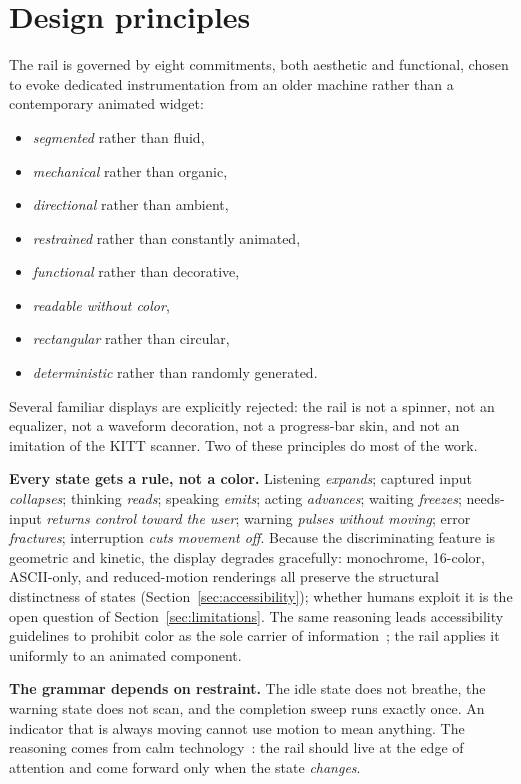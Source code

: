 \documentclass[11pt]{article}
\begin{document}
\section{Design principles}
\label{sec:principles}

The rail is governed by eight commitments, both aesthetic and functional, chosen to
evoke dedicated instrumentation from an older machine rather than a
contemporary animated widget:

\begin{itemize}
\item \emph{segmented} rather than fluid,
\item \emph{mechanical} rather than organic,
\item \emph{directional} rather than ambient,
\item \emph{restrained} rather than constantly animated,
\item \emph{functional} rather than decorative,
\item \emph{readable without color},
\item \emph{rectangular} rather than circular,
\item \emph{deterministic} rather than randomly generated.
\end{itemize}

Several familiar displays are explicitly rejected: the rail is not a
spinner, not an equalizer, not a waveform decoration, not a progress-bar
skin, and not an imitation of the KITT scanner. Two of these principles do most of the work.

\textbf{Every state gets a rule, not a color.} Listening \emph{expands};
captured input \emph{collapses}; thinking \emph{reads}; speaking
\emph{emits}; acting \emph{advances}; waiting \emph{freezes}; needs-input
\emph{returns control toward the user}; warning \emph{pulses without
moving}; error \emph{fractures}; interruption \emph{cuts movement off}.
Because the discriminating feature is geometric and kinetic, the display
degrades gracefully: monochrome, 16-color, ASCII-only, and reduced-motion
renderings all preserve the structural distinctness of states
(Section~\ref{sec:accessibility}); whether humans exploit it is the open
question of Section~\ref{sec:limitations}.
The same reasoning leads accessibility guidelines to prohibit color as the sole carrier of information~\cite{wcag21}; the rail applies it uniformly to an animated component.

\textbf{The grammar depends on restraint.} The idle state does not breathe, the
warning state does not scan, and the completion sweep runs exactly once.
An indicator that is always moving cannot use motion to mean anything.
The reasoning comes from calm technology~\cite{weiser1997}: the rail should live at the edge of attention and come forward only when the state \emph{changes}.
\end{document}

